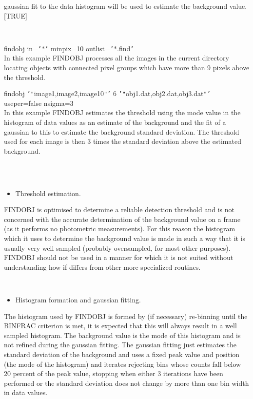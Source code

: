 \documentclass[twoside,11pt]{article}
\renewcommand{\_}{\texttt{\symbol{95}}}
\newcommand{\qt}[1]{{\tt "}#1{\tt "}}
\newcommand{\qs}[1]{{\tt '}#1{\tt '}}
\newcommand{\routine}[1]{{\sc #1}}
\newcommand{\sstexamples}[1]{
   \item[Examples:] \mbox{} \\
   \vspace{-3.5ex}
   \begin{description}
      #1
   \end{description}
}
\newcommand{\sstexamplesubsection}[2]{\sloppy \item{\ssttt #1} \mbox{} \\ #2 }
\newcommand{\sstnotes}[1]{\item[Notes:] \mbox{} \\[1.3ex] #1}
\newcommand{\sstitemlist}[1]{
  \mbox{} \\
  \vspace{-3.5ex}
  \begin{itemize}
     #1
  \end{itemize}
}
\newcommand{\sstitem}{\item}
\newcommand{\sstexamples}[1]{
      \item[Examples:] \\
      \begin{description}
         #1
      \end{description}
      \\
   }
\newcommand{\sstexamplesubsection}[2]{\item[{\ssttt #1}] #2}
\newcommand{\sstnotes}[1]{\item[Notes:] #1 }
\newcommand{\sstitemlist}[1]{
      \begin{itemize}
         #1
      \end{itemize}
      \\
   }
\newcommand{\sstitem}{\item}
\begin{document}
{{{         gaussian fit to the data histogram will be used to estimate the
         background value.
         [TRUE]
      }
   }
   \sstexamples{
      \sstexamplesubsection{
         findobj in=\qs{$*$} minpix=10 outlist=\qs{$*$.find}
      } {
         In this example \routine{FINDOBJ} processes all the images in the current
         directory locating objects with connected pixel groups which
         have more than 9 pixels above the threshold.
      }
      \sstexamplesubsection{
         findobj \qs{\qt{image1,image2,image10}} 6
                 \qs{\qt{obj1.dat,obj2.dat,obj3.dat}}
                 useper=false nsigma=3
      } {
         In this example \routine{FINDOBJ} estimates the threshold using the mode
         value in the histogram of data values as an estimate of the
         background and the fit of a gaussian to this to estimate the
         background standard deviation. The threshold used for each image
         is then 3 times the standard deviation above the estimated
         background.
      }
   }
   \sstnotes{
      \sstitemlist{

         \sstitem
         Threshold estimation.

      }
        \routine{FINDOBJ} is optimised to determine a reliable detection
        threshold and is not concerned with the accurate
        determination of the background value on a frame (as it
        performs no photometric measurements). For this reason the
        histogram which it uses to determine the background value is
        made in such a way that it is usually very well sampled
        (probably oversampled, for most other purposes). \routine{FINDOBJ}
        should not be used in a manner for which it is not suited
        without understanding how if differs from other more
        specialized routines.

      \sstitemlist{

         \sstitem
         Histogram formation and gaussian fitting.

      }
        The histogram used by \routine{FINDOBJ} is formed by (if necessary)
        re-binning until the BINFRAC criterion is met, it is expected
        that this will always result in a well sampled histogram. The
        background value is the mode of this histogram and is not
        refined during the gaussian fitting. The gaussian fitting just
        estimates the standard deviation of the background and uses a
        fixed peak value and position (the mode of the histogram) and
        iterates rejecting bins whose counts fall below 20 percent of
        the peak value, stopping when either 3 iterations have been
        performed or the standard deviation does not change by more
        than one bin width in data values.

}}
\end{document}
